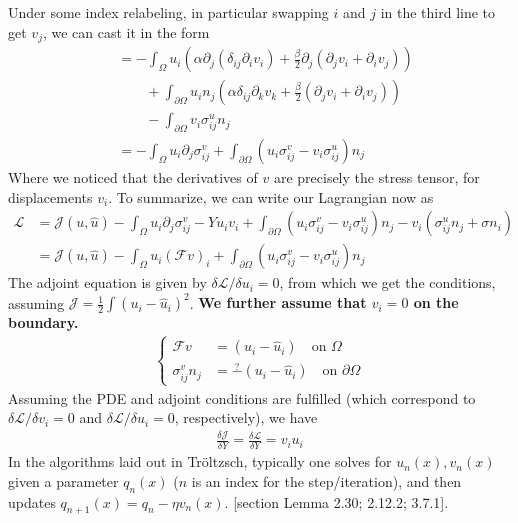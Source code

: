 \documentclass{article}
\begin{document}
Under some index relabeling, in particular swapping $i$ and $j$ in the third line to get $v_j$, we can cast it in the form
\begin{align*}
    &= -\int_{\Omega} u_i \left(\alpha\partial_j(\delta_{ij}\partial_i v_i) +
    \frac{\beta}{2}\partial_j(\partial_j v_i + \partial_i v_j)\right)
    \\
    &\quad\quad +\int_{\partial\Omega}u_i n_j\left(\alpha\delta_{ij} \partial_k v_k + \frac{\beta}{2}(\partial_j v_i + \partial_i v_j)\right)
    \\
    &\quad\quad- \int_{\partial\Omega} v_i \sigma_{ij}^{u}n_j
    \\
    &= -\int_{\Omega} u_i \partial_j\sigma_{ij}^v + \int_{\partial\Omega} \left(u_i \sigma_{ij}^v - v_i \sigma_{ij}^{u}\right)n_j
\end{align*}
Where we noticed that the derivatives of $v$ are precisely the stress tensor, for displacements $v_i$.
To summarize, we can write our Lagrangian now as 
\begin{align*}
    \mathcal{L} &= \mathcal{J}(u,\hat u) - \int_{\Omega} u_i \partial_j\sigma_{ij}^v - Yu_iv_i +
    \int_{\partial\Omega} \left(u_i \sigma_{ij}^v - v_i \sigma_{ij}^{u}\right)n_j - v_i (\sigma_{ij}^u n_j + \sigma n_i)
    \\
    &=
     \mathcal{J}(u,\hat u) - \int_{\Omega} u_i (\mathcal{F}v)_i  +
    \int_{\partial\Omega} \left(u_i \sigma_{ij}^v - v_i \sigma_{ij}^{u}\right)n_j 
\end{align*}
The adjoint equation is given by $\delta\mathcal{L}/\delta u_i = 0$, from which we get the conditions, assuming $\mathcal{J}=\frac{1}{2}\int (u_i - \hat{u}_i)^2$. \textbf{We further assume that $v_i=0$ on the boundary.}
\begin{align*}
    \begin{cases}
     \mathcal{F}v &= (u_i - \hat{u}_i) \quad\text{on $\Omega$}
     \\
     \sigma_{ij}^v n_j &= \overset{?}{-}(u_i - \hat{u}_i) \quad\text{on $\partial\Omega$}
    \end{cases}
\end{align*}
Assuming the PDE and adjoint conditions are fulfilled (which correspond to $\delta\mathcal{L}/\delta v_i = 0$ and $\delta\mathcal{L}/\delta u_i = 0$, respectively), we have 
\begin{align*}
     \frac{\delta\mathcal{J}}{\delta Y} = \frac{\delta\mathcal{L}}{\delta Y} = v_iu_i
\end{align*}
In the algorithms laid out in Tr{\"o}ltzsch, typically one solves for $u_n(x), v_n(x)$ given a parameter $q_n(x)$ ($n$ is an index for the step/iteration), and then updates $q_{n+1}(x)=q_{n}-\eta v_n(x)$. \cite{Troeltzsch2010}[section Lemma 2.30; 2.12.2; 3.7.1].
\end{document}
